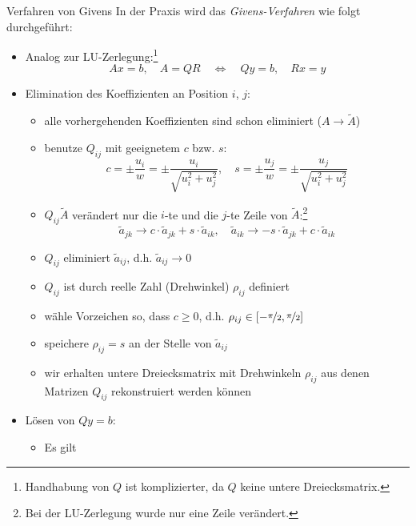 \begin{defi}{Verfahren von Givens}
    In der Praxis wird das \emph{Givens-Verfahren} wie folgt durchgeführt:
    \begin{itemize}
        \item Analog zur LU-Zerlegung:\footnote{Handhabung von $Q$ ist komplizierter, da $Q$ keine untere Dreiecksmatrix.}
              \[
                  Ax = b, \quad A = QR \quad \iff \quad Qy = b, \quad Rx = y
              \]
        \item Elimination des Koeffizienten an Position $i$, $j$:
              \begin{itemize}
                  \item alle vorhergehenden Koeffizienten sind schon eliminiert ($A \to \tilde{A}$)
                  \item benutze $Q_{ij}$ mit geeignetem $c$ bzw. $s$:
                        \[
                            c = \pm \frac{u_i}{w} = \pm \frac{u_i}{\sqrt{u_i^2 + u_j^2}}, \quad s = \pm \frac{u_j}{w} = \pm \frac{u_j}{\sqrt{u_i^2 + u_j^2}}
                        \]
                  \item $Q_{ij} \tilde{A}$ verändert nur die $i$-te und die $j$-te Zeile von $\tilde{A}$:\footnote{Bei der LU-Zerlegung wurde nur eine Zeile verändert.}
                        \[
                            \tilde{a}_{jk} \to c \cdot \tilde{a}_{jk} + s \cdot \tilde{a}_{ik}, \quad \tilde{a}_{ik} \to - s \cdot \tilde{a}_{jk} + c \cdot \tilde{a}_{ik}
                        \]
                  \item $Q_{ij}$ eliminiert $\tilde{a}_{ij}$, d.h. $\tilde{a}_{ij} \to 0$
                  \item $Q_{ij}$ ist durch reelle Zahl (Drehwinkel) $\rho_{ij}$ definiert
                  \item wähle Vorzeichen so, dass $c \geq 0$, d.h. $\rho_{ij} \in \left[ -\nicefrac{\pi}{2}, \nicefrac{\pi}{2} \right]$
                  \item speichere $\rho_{ij} = s$ an der Stelle von $\tilde{a}_{ij}$
                  \item wir erhalten untere Dreiecksmatrix mit Drehwinkeln $\rho_{ij}$ aus denen Matrizen $Q_{ij}$ rekonstruiert werden können
              \end{itemize}
        \item Lösen von $Qy = b$:
              \begin{itemize}
                  \item Es gilt
                        \[
\]
\end{itemize}
\end{itemize}
\end{defi}
